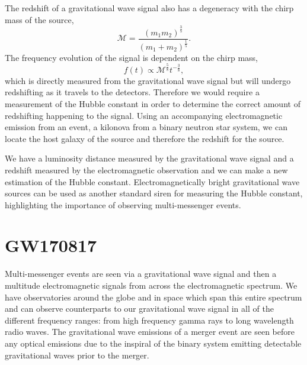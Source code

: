The redshift of a gravitational wave signal also has a degeneracy with the chirp mass of the source,
%
\begin{equation}
\mathcal{M} = \frac{(m_1 m_2)^{\frac{3}{5}}}{(m_1 + m_2)^{\frac{1}{5}}}.
\end{equation}
%
The frequency evolution of the signal is dependent on the chirp mass,
%
\begin{equation}
f(t) \propto \mathcal{M}^{\frac{5}{8}}t^{-\frac{3}{8}},
\end{equation}
%
which is directly measured from the gravitational wave signal but will undergo redshifting as it travels to the detectors. Therefore we would require a measurement of the Hubble constant in order to determine the correct amount of redshifting happening to the signal. Using an accompanying electromagnetic emission from an event, a kilonova from a binary neutron star system, we can locate the host galaxy of the source and therefore the redshift for the source.

We have a luminosity distance measured by the gravitational wave signal and a redshift measured by the electromagnetic observation and we can make a new estimation of the Hubble constant. Electromagnetically bright gravitational wave sources can be used as another standard siren for measuring the Hubble constant, highlighting the importance of observing multi-messenger events.

\section{GW170817}

Multi-messenger events are seen via a gravitational wave signal and then a multitude electromagnetic signals from across the electromagnetic spectrum. We have observatories around the globe and in space which span this entire spectrum and can observe counterparts to our gravitational wave signal in all of the different frequency ranges: from high frequency gamma rays to long wavelength radio waves. The gravitational wave emissions of a merger event are seen before any optical emissions due to the inspiral of the binary system emitting detectable gravitational waves prior to the merger.

